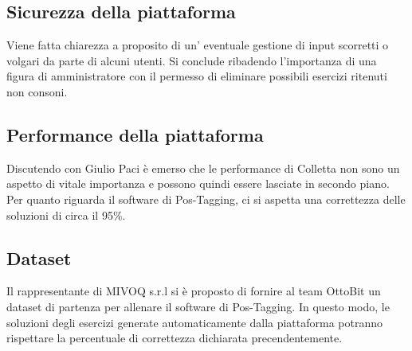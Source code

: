 \documentclass[11pt,a4paper]{article}
\begin{document}
	\subsection{Sicurezza della piattaforma}
	Viene fatta chiarezza a proposito di un' eventuale gestione di input scorretti o volgari da parte di alcuni utenti. Si conclude ribadendo l'importanza di una figura di amministratore con il permesso di eliminare possibili esercizi ritenuti non consoni.
	\subsection{Performance della piattaforma}
	Discutendo con Giulio Paci è emerso che le performance di Colletta non sono un aspetto di vitale importanza e possono quindi essere lasciate in secondo piano.
	Per quanto riguarda il software di Pos-Tagging, ci si aspetta una correttezza delle soluzioni di circa il 95\%.
	\subsection{Dataset}
	Il rappresentante di MIVOQ s.r.l si è proposto di fornire al team OttoBit un dataset di partenza per allenare il software di Pos-Tagging. In questo modo, le soluzioni degli esercizi generate automaticamente dalla piattaforma potranno rispettare la percentuale di correttezza dichiarata precendentemente.
\end{document}
